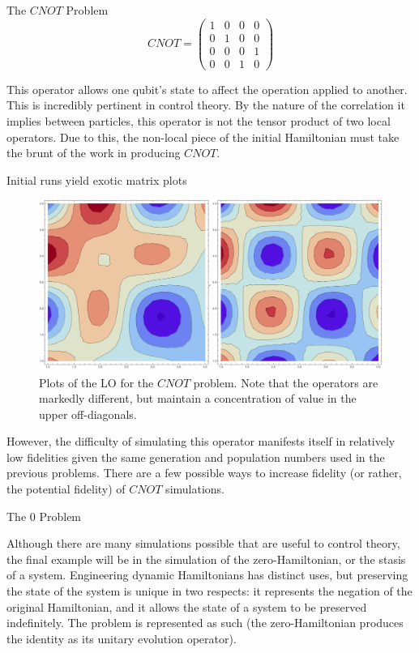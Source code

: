 \documentclass[12pt]{beamer}
\begin{document}
\begin{frame}
\begin{columns}
\begin{column}{.45\textwidth}
\begin{exampleblock}{The $CNOT$ Problem}
	\begin{equation}
	CNOT = 
	\begin{pmatrix}
		1  &  0  &  0  &  0  \\
		0  &  1  &  0  &  0  \\
		0  &  0  &  0  &  1  \\
		0  &  0  &  1  &  0 
	\end{pmatrix}
	\end{equation}

	This operator allows one qubit's state to affect the operation applied to another. This is incredibly pertinent in control theory. By the nature of the correlation it implies between particles, this operator is not the tensor product of two local operators. Due to this, the non-local piece of the initial Hamiltonian must take the brunt of the work in producing $CNOT$. 

	Initial runs yield exotic matrix plots 
	
	\begin{figure}[htpb]
		\centering
			\includegraphics[scale=0.4]{cnot_matrices.png}
		\centering
		\caption{Plots of the LO for the $CNOT$ problem. Note that the operators are markedly different, but maintain a concentration of value in the upper off-diagonals.}
		\label{fig:cnot_matrix}
	\end{figure}

	However, the difficulty of simulating this operator manifests itself in relatively low fidelities given the same generation and population numbers used in the previous problems. There are a few possible ways to increase fidelity (or rather, the potential fidelity) of $CNOT$ simulations.
     \end{exampleblock}

			\begin{exampleblock}{The 0 Problem}

	Although there are many simulations possible that are useful to control theory, the final example will be in the simulation of the zero-Hamiltonian, or the stasis of a system. Engineering dynamic Hamiltonians has distinct uses, but preserving the state of the system is unique in two respects: it represents the negation of the original Hamiltonian, and it allows the state of a system to be preserved indefinitely. The problem is represented as such (the zero-Hamiltonian produces the identity as its unitary evolution operator). 


\end{exampleblock}
\end{column}
\end{columns}
\end{frame}
\end{document}
